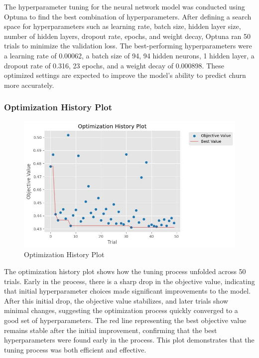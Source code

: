 The hyperparameter tuning for the neural network model was conducted using Optuna to find the best combination of hyperparameters. After defining a search space for hyperparameters such as learning rate, batch size, hidden layer size, number of hidden layers, dropout rate, epochs, and weight decay, Optuna ran 50 trials to minimize the validation loss. The best-performing hyperparameters were a learning rate of 0.00062, a batch size of 94, 94 hidden neurons, 1 hidden layer, a dropout rate of 0.316, 23 epochs, and a weight decay of 0.000898. These optimized settings are expected to improve the model's ability to predict churn more accurately.

\subsubsection{Optimization History Plot}

\begin{figure}[hbt!]
    \centering
    \includegraphics[width=1\linewidth]{Images/5.6.1.a.jpg}
    \caption{Optimization History Plot}
    \label{fig:enter-label}
\end{figure}

The optimization history plot shows how the tuning process unfolded across 50 trials. Early in the process, there is a sharp drop in the objective value, indicating that initial hyperparameter choices made significant improvements to the model. After this initial drop, the objective value stabilizes, and later trials show minimal changes, suggesting the optimization process quickly converged to a good set of hyperparameters. The red line representing the best objective value remains stable after the initial improvement, confirming that the best hyperparameters were found early in the process. This plot demonstrates that the tuning process was both efficient and effective.

